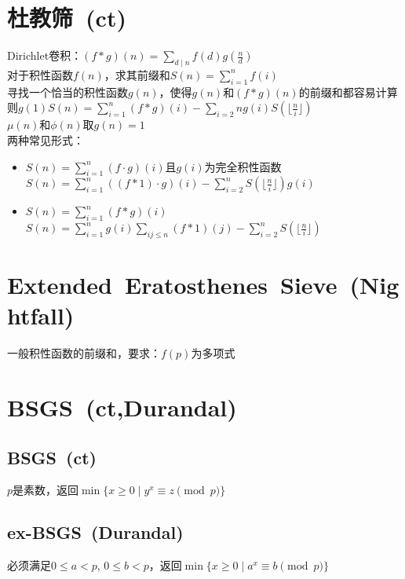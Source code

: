 \section{杜教筛\ \small(ct)}
	\noindent Dirichlet卷积：$ (f \ast g) (n) = \sum\limits_{d \mid n}^{} f(d) g(\frac{n}{d}) $
	\\对于积性函数$ f(n) $，求其前缀和$ S(n) = \sum\limits_{i = 1}^{n} f(i) $
	\\寻找一个恰当的积性函数$ g(n) $，使得$ g(n) $和$ (f \ast g) (n) $的前缀和都容易计算
	\\则$ g(1) S(n) = \sum\limits_{i = 1}^{n} (f \ast g) (i) - \sum\limits_{i = 2}{n} g(i) S(\lfloor \frac{n}{i} \rfloor) $
	\\$ \mu (n) $和$ \phi (n) $取$ g(n) = 1 $
	\\两种常见形式：
	\begin{itemize}[wide=0pt]
		\item $ S(n) = \sum\limits_{i = 1}^{n} (f \cdot g) (i) $且$ g(i) $为完全积性函数
			\\$ S(n) = \sum\limits_{i = 1}^{n} ((f \ast 1) \cdot g) (i) - \sum\limits_{i = 2}^{n} S(\lfloor \frac{n}{i} \rfloor) g(i) $
		\item $ S(n) = \sum\limits_{i = 1}^{n} (f \ast g) (i) $
			\\$ S(n) = \sum\limits_{i = 1}^{n} g (i) \sum\limits_{ij \leq n}^{} (f \ast 1) (j) - \sum\limits_{i = 2}^{n} S(\lfloor \frac{n}{i} \rfloor) $
	\end{itemize}
\section{Extended\ Eratosthenes\ Sieve\ \small(Nightfall)}
	一般积性函数的前缀和，要求：$ f(p) $为多项式
\section{BSGS\ \small(ct,Durandal)}
	\subsection*{BSGS\ \small(ct)}
		$ p $是素数，返回$ \min\lbrace x \geq 0 \mid y^x \equiv z \pmod p \rbrace $
	\subsection*{ex-BSGS\ \small(Durandal)}
		必须满足$ 0 \leq a < p $, $ 0 \leq b < p $，返回$ \min\lbrace x \geq 0 \mid a^x \equiv b \pmod p\rbrace $
